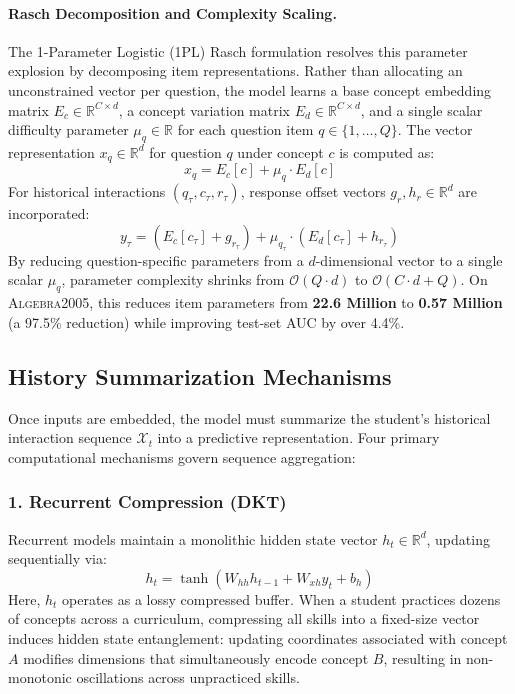 \documentclass[11pt]{article}
\begin{document}
\paragraph{Rasch Decomposition and Complexity Scaling.}
The 1-Parameter Logistic (1PL) Rasch formulation resolves this parameter explosion by decomposing item representations. Rather than allocating an unconstrained vector per question, the model learns a base concept embedding matrix $E_c \in \mathbb{R}^{C \times d}$, a concept variation matrix $E_d \in \mathbb{R}^{C \times d}$, and a single scalar difficulty parameter $\mu_q \in \mathbb{R}$ for each question item $q \in \{1, \dots, Q\}$. The vector representation $x_q \in \mathbb{R}^d$ for question $q$ under concept $c$ is computed as:
\begin{equation}
x_q = E_c[c] + \mu_q \cdot E_d[c]
\label{eq:rasch_embed}
\end{equation}
For historical interactions $(q_\tau, c_\tau, r_\tau)$, response offset vectors $g_r, h_r \in \mathbb{R}^d$ are incorporated:
\begin{equation}
y_\tau = (E_c[c_\tau] + g_{r_\tau}) + \mu_{q_\tau} \cdot (E_d[c_\tau] + h_{r_\tau})
\end{equation}
By reducing question-specific parameters from a $d$-dimensional vector to a single scalar $\mu_q$, parameter complexity shrinks from $\mathcal{O}(Q \cdot d)$ to $\mathcal{O}(C \cdot d + Q)$. On \textsc{Algebra2005}, this reduces item parameters from \textbf{22.6 Million} to \textbf{0.57 Million} (a 97.5\% reduction) while improving test-set AUC by over 4.4\%.

\subsection{History Summarization Mechanisms}
Once inputs are embedded, the model must summarize the student's historical interaction sequence $\mathcal{X}_t$ into a predictive representation. Four primary computational mechanisms govern sequence aggregation:

\subsubsection{1. Recurrent Compression (DKT)}
Recurrent models maintain a monolithic hidden state vector $h_t \in \mathbb{R}^d$, updating sequentially via:
\begin{equation}
h_t = \tanh(W_{hh} h_{t-1} + W_{xh} y_t + b_h)
\end{equation}
Here, $h_t$ operates as a lossy compressed buffer. When a student practices dozens of concepts across a curriculum, compressing all skills into a fixed-size vector induces hidden state entanglement: updating coordinates associated with concept $A$ modifies dimensions that simultaneously encode concept $B$, resulting in non-monotonic oscillations across unpracticed skills.
\end{document}
